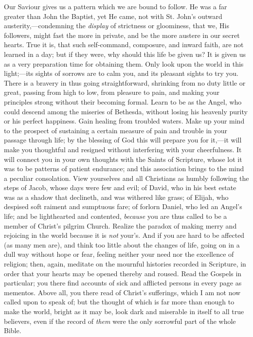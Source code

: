 Our Saviour gives us a pattern which we are bound to
follow. He was a far greater than John the Baptist, yet
He came, not with St. John's outward
austerity,—condemning the \emph{display} of
strictness or gloominess, that we, His followers, might
fast the more in private, and be the more austere in our
secret hearts. True it is, that such self-command,
composure, and inward faith, are not learned in a day;
but if they were, why should this life be given us? It is
given us as a very preparation time for obtaining them.
Only look upon the world in this light;—its sights
of sorrows are to calm you, and its pleasant sights to
try you. There is a bravery in thus going
straightforward, shrinking from no duty little or great,
passing from high to low, from pleasure to pain, and
making your principles strong without their becoming
formal. Learn to be as the Angel, who could descend among
the miseries of Bethesda, without losing his heavenly
purity or his perfect happiness. Gain healing from
troubled waters. Make up your mind to the prospect of
sustaining a certain measure of pain and trouble in your
passage through life; by the blessing of God this will
prepare you for it,—it will make you thoughtful and
resigned without interfering with your cheerfulness. It
will connect you in your own thoughts with the Saints of
Scripture, whose lot it was to be patterns of patient
endurance; and this association brings to the mind a
peculiar consolation. View yourselves and all Christians
as humbly following the steps of Jacob, whose days were
few and evil; of David, who in his best estate was as a
shadow that declineth, and was withered like grass; of
Elijah, who despised soft raiment and sumptuous fare; of
forlorn Daniel, who led an Angel's life; and be
lighthearted and contented, \emph{because} you are thus
called to be a member of Christ's pilgrim Church. Realize
the paradox of making merry and rejoicing in the world
because it is \emph{not} your's. And if you are hard to
be affected (as many men are), and think too little about
the changes of life, going on in a dull way without hope
or fear, feeling neither your need nor the excellence of
religion; then, again, meditate on the mournful histories
recorded in Scripture, in order that your hearts may be
opened thereby and roused. Read the Gospels in
particular; you there find accounts of sick and afflicted
persons in every page as mementos. Above all, you there
read of Christ's sufferings, which I am not now called
upon to speak of; but the thought of which is far more
than enough to make the world, bright as it may be, look
dark and miserable in itself to all true believers, even
if the record of \emph{them} were the only sorrowful part
of the whole Bible.


